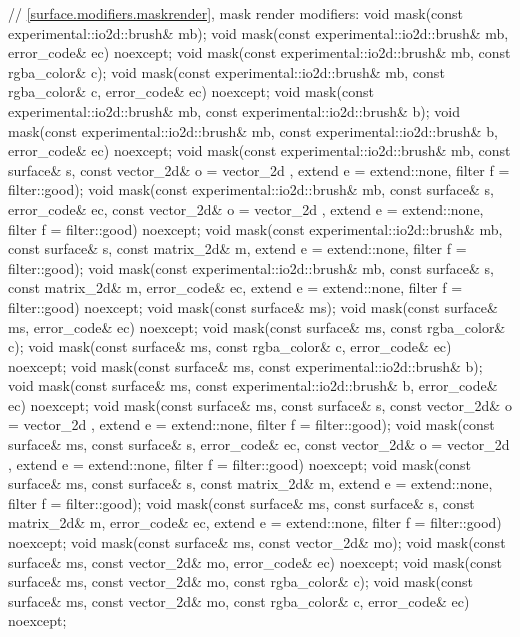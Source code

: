 \begin{codeblock}
{{{{{    // \ref{surface.modifiers.maskrender}, mask render modifiers:
    void mask(const experimental::io2d::brush& mb);
    void mask(const experimental::io2d::brush& mb, error_code& ec)
      noexcept;
    void mask(const experimental::io2d::brush& mb, const rgba_color& c);
    void mask(const experimental::io2d::brush& mb, const rgba_color& c, 
      error_code& ec) noexcept;
    void mask(const experimental::io2d::brush& mb,
      const experimental::io2d::brush& b);
    void mask(const experimental::io2d::brush& mb,
      const experimental::io2d::brush& b, error_code& ec) noexcept;
    void mask(const experimental::io2d::brush& mb, const surface& s,
      const vector_2d& o = vector_2d{ }, extend e = extend::none, 
      filter f = filter::good);
    void mask(const experimental::io2d::brush& mb, const surface& s,
      error_code& ec, const vector_2d& o = vector_2d{ },
      extend e = extend::none, filter f = filter::good) noexcept;
    void mask(const experimental::io2d::brush& mb, const surface& s,
      const matrix_2d& m, extend e = extend::none, filter f = filter::good);
    void mask(const experimental::io2d::brush& mb, const surface& s,
      const matrix_2d& m, error_code& ec, extend e = extend::none,
      filter f = filter::good) noexcept;
    void mask(const surface& ms);
    void mask(const surface& ms, error_code& ec) noexcept;
    void mask(const surface& ms, const rgba_color& c);
    void mask(const surface& ms, const rgba_color& c, error_code& ec) noexcept;
    void mask(const surface& ms, const experimental::io2d::brush& b);
    void mask(const surface& ms, const experimental::io2d::brush& b, 
      error_code& ec) noexcept;
    void mask(const surface& ms, const surface& s,
      const vector_2d& o = vector_2d{ }, extend e = extend::none,
      filter f = filter::good);
    void mask(const surface& ms, const surface& s, error_code& ec,
      const vector_2d& o = vector_2d{ }, extend e = extend::none,
      filter f = filter::good) noexcept;
    void mask(const surface& ms, const surface& s, const matrix_2d& m,
      extend e = extend::none, filter f = filter::good);
    void mask(const surface& ms, const surface& s, const matrix_2d& m,
      error_code& ec, extend e = extend::none, filter f = filter::good)
      noexcept;
    void mask(const surface& ms, const vector_2d& mo);
    void mask(const surface& ms, const vector_2d& mo, error_code& ec) noexcept;
    void mask(const surface& ms, const vector_2d& mo, const rgba_color& c);
    void mask(const surface& ms, const vector_2d& mo, const rgba_color& c,
      error_code& ec) noexcept;
}}}}}
\end{codeblock}
